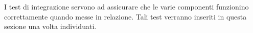 I test di integrazione servono ad assicurare che le varie componenti funzionino correttamente quando messe in relazione.
\newline
Tali test verranno inseriti in questa sezione una volta individuati.